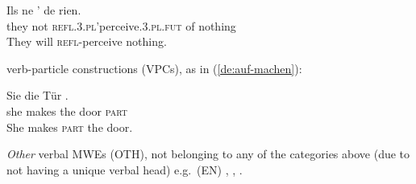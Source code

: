 \documentclass[output=paper,
modfonts,
]{langscibook}
\begin{document}
\begin{senum}
\begin{senum}
\ea \label{fr:se-apercevoir}
\settowidth {} 
\gll Ils ne ' de rien. \\
they not \textsc{refl.3.pl}'perceive.\textsc{3.pl.fut} of nothing \\ 
\glt They will \textsc{refl}-perceive nothing. 
\z

\item verb-particle constructions (VPCs), as in (\ref{de:auf-machen}):

\ea \label{de:auf-machen}
\settowidth {} 
\gll Sie  die Tür . \\
she makes the door \textsc{part} \\ 
\glt She makes \textsc{part} the door. 
\z

\end{senum}
\item \textit{Other} verbal MWEs (OTH), not belonging to any of the categories above (due to not having a unique verbal head) e.g.\ (EN) , , .
\end{senum}
\end{document}
